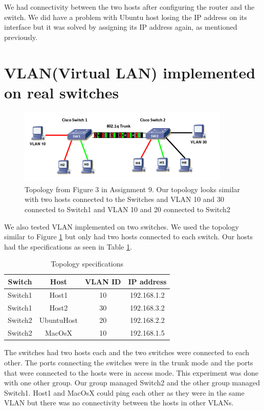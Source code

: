 \documentclass{article}
\begin{document}
We had connectivity between the two hosts after configuring the router and the switch. We did have a problem with Ubuntu host losing the IP address on its interface but it was solved by assigning its IP address again, as mentioned previously.

\section{VLAN(Virtual LAN) implemented on real switches}

\begin{figure}
    \centering
    \includegraphics[width=0.9\textwidth]{4topo}
    \caption{Topology from Figure 3 in Assignment 9. Our topology looks similar with two hosts connected to the Switches and VLAN 10 and 30 connected to Switch1 and VLAN 10 and 20 connected to Switch2}
    \label{fig:4topo}
\end{figure}

We also tested VLAN implemented on two switches. We used the topology similar to Figure \ref{fig:4topo} but only had two hosts connected to each switch. Our hosts had the specifications as seen in Table \ref{tab:4topospecs}. 

\begin{table}
    \centering
    \begin{tabular}{|c|c|c|c|}
    \hline
         Switch & Host & VLAN ID & IP address\\
    \hline
    Switch1 & Host1 & 10 & 192.168.1.2 \\
    Switch1 & Host2 & 30 & 192.168.3.2 \\
    Switch2 & UbuntuHost & 20 & 192.168.2.2 \\
    Switch2 & MacOsX & 10 & 192.168.1.5 \\
    \hline
    \end{tabular}
    \caption{Topology specifications}
    \label{tab:4topospecs}
\end{table}

The switches had two hosts each and the two switches were connected to each other. The ports connecting the switches were in the trunk mode and the ports that were connected to the hosts were in access mode. This experiment was done with one other group. Our group managed Switch2 and the other group managed Switch1. Host1 and MacOsX could ping each other as they were in the same VLAN but there was no connectivity between the hosts in other VLANs. 
\end{document}
